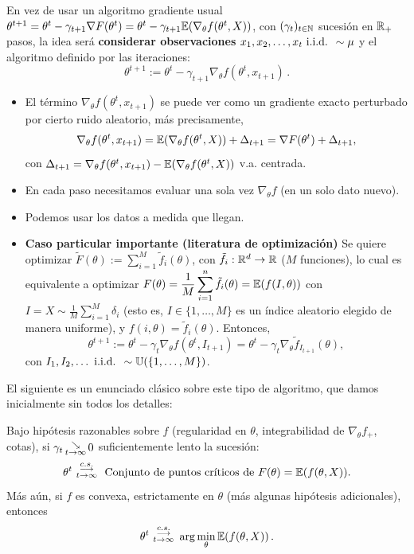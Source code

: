 En vez de usar un algoritmo gradiente usual $\theta^{t+1}=\theta^t-\gamma_{t+1}\nabla F(\theta^t)=\theta^t-\gamma_{t+1}\mathbb{E}(\nabla_\theta f(\theta^t,X))$, con $(\gamma_t)_{t\in\mathbb{N}}$ sucesión en $\mathbb{R}_+$ pasos, la idea ser\'a \textbf{considerar observaciones} $x_1,x_2,\dots,x_t \mbox{ i.i.d. } \sim\mu$ y el algoritmo definido por las iteraciones: 
$$ \theta^{t+1}:=\theta^t-\gamma_{t+1}\nabla_\theta f(\theta^t,x_{t+1})\,.$$
\begin{remark}
\beforeitemize
\begin{itemize}
    \item El término $\nabla_\theta f(\theta^t,x_{t+1})$ se puede ver como un gradiente exacto perturbado por cierto ruido aleatorio, m\'as precisamente, 
    $$ \nabla_\theta f(\theta^t,x_{t+1})=\mathbb{E}(\nabla_\theta f(\theta^t,X))+\Delta_{t+1}=\nabla F(\theta^t)+\Delta_{t+1},$$
    con $\Delta_{t+1}=\nabla_\theta f(\theta^t,x_{t+1})-\mathbb{E}(\nabla_\theta f(\theta^t,X))$  v.a. centrada. 
    \item En cada paso necesitamos evaluar una sola vez $\nabla_\theta f$ (en un solo dato nuevo).
    \item Podemos usar los datos a medida que llegan.
    \item \textbf{Caso particular importante (literatura de optimización)}
    \newline Se quiere optimizar $\tilde{F}(\theta):=\displaystyle\sum^M_{i=1}\tilde{f}_i(\theta)$, con $\tilde{f}_i:\mathbb{R}^d\to\mathbb{R}$ ($M$ funciones), lo cual es equivalente a
    optimizar $F(\theta)=\displaystyle\frac{1}{M}\sum^n_{i=1}\tilde{f}_i(\theta)=\mathbb{E}(f(I,\theta))$ con $I=X\sim \frac{1}{M}\sum^M_{i=1}\delta_i$ (esto es,  $I\in\{1,\dots,M\}$ es un índice  aleatorio  elegido de manera uniforme), y $f(i,\theta)=\tilde{f}_i(\theta)$.  Entonces, 
    $$ \theta^{t+1}:=\theta^t-\gamma_t \nabla_\theta f(\theta^t,I_{t+1})=\theta^t-\gamma_t \nabla_\theta\tilde{f}_{I_{t+1}}(\theta), $$
    con $I_1,I_2,\dots \mbox{ i.i.d. }\sim\mathbb{U}(\{1,\dots,M\})$.
\end{itemize}
\end{remark}
El siguiente es un enunciado cl\'asico sobre este tipo de algoritmo, que damos inicialmente sin todos los detalles: 
\begin{theorem} 
Bajo hipótesis razonables sobre $f$ (regularidad en $\theta$, integrabilidad de $\nabla_\theta f_+$, cotas), si $\gamma_t\,\substack{\searrow \\ \tiny{t\to\infty}}\, 0$ suficientemente lento la sucesión:
$$ \theta^t\mbox{ }\overset{c.s.}{\substack{\longrightarrow \\t \to \infty}}\mbox{ }\mbox{ Conjunto de puntos críticos de } F(\theta)=\mathbb{E}(f(\theta,X)).$$
Más aún, si $f$ es convexa,  estrictamente en $\theta$ (más algunas hipótesis adicionales), entonces
$$ \theta^t\mbox{ }\overset{c.s.}{\substack{\longrightarrow \\t \to \infty}}\mbox{ }\arg\min_\theta \mathbb{E}(f(\theta,X))\,.$$
\end{theorem}
